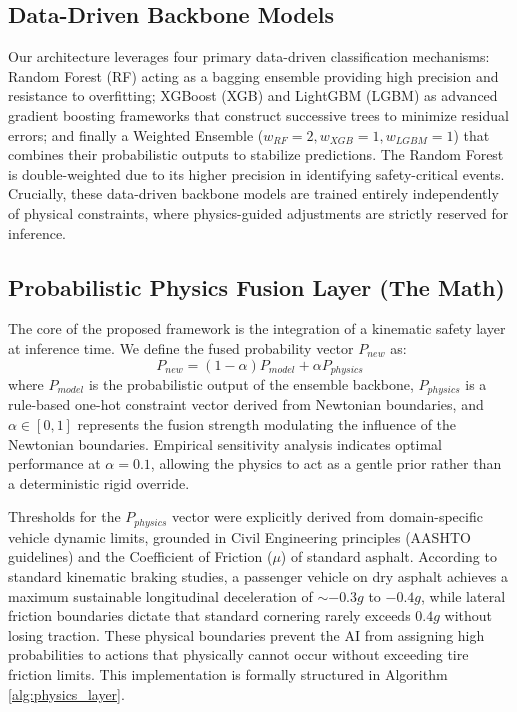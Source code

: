 \documentclass[pdflatex,sn-mathphys-num]{sn-jnl}
\theoremstyle{thmstyleone}
\theoremstyle{thmstyletwo}
\theoremstyle{thmstylethree}
\begin{document}
\subsection{Data-Driven Backbone Models}
Our architecture leverages four primary data-driven classification mechanisms: Random Forest (RF) acting as a bagging ensemble providing high precision and resistance to overfitting; XGBoost (XGB) and LightGBM (LGBM) as advanced gradient boosting frameworks that construct successive trees to minimize residual errors; and finally a Weighted Ensemble ($w_{RF}=2, w_{XGB}=1, w_{LGBM}=1$) that combines their probabilistic outputs to stabilize predictions. The Random Forest is double-weighted due to its higher precision in identifying safety-critical events. Crucially, these data-driven backbone models are trained entirely independently of physical constraints, where physics-guided adjustments are strictly reserved for inference.

\FloatBarrier
\subsection{Probabilistic Physics Fusion Layer (The Math)}
The core of the proposed framework is the integration of a kinematic safety layer at inference time. We define the fused probability vector $P_{new}$ as:
\begin{equation}
P_{new} = (1 - \alpha) P_{model} + \alpha P_{physics}
\end{equation}
where $P_{model}$ is the probabilistic output of the ensemble backbone, $P_{physics}$ is a rule-based one-hot constraint vector derived from Newtonian boundaries, and $\alpha \in [0,1]$ represents the fusion strength modulating the influence of the Newtonian boundaries. Empirical sensitivity analysis indicates optimal performance at $\alpha = 0.1$, allowing the physics to act as a gentle prior rather than a deterministic rigid override.

Thresholds for the $P_{physics}$ vector were explicitly derived from domain-specific vehicle dynamic limits, grounded in Civil Engineering principles (AASHTO guidelines) and the Coefficient of Friction ($\mu$) of standard asphalt. According to standard kinematic braking studies, a passenger vehicle on dry asphalt achieves a maximum sustainable longitudinal deceleration of $\sim -0.3g$ to $-0.4g$, while lateral friction boundaries dictate that standard cornering rarely exceeds $0.4g$ without losing traction. These physical boundaries prevent the AI from assigning high probabilities to actions that physically cannot occur without exceeding tire friction limits. This implementation is formally structured in Algorithm \ref{alg:physics_layer}.
\end{document}
